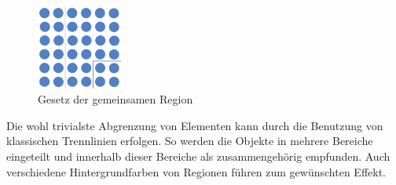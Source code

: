 \begin{figure}[H]
 \centering
 \includegraphics[width=0.25\textwidth]{grafiken/region.png}
 \caption{Gesetz der gemeinsamen Region}
 \label{fig:gesetzRegion}
\end{figure}
Die wohl trivialste Abgrenzung von Elementen kann durch die Benutzung von klassischen Trennlinien erfolgen. So werden die Objekte in mehrere Bereiche eingeteilt und innerhalb dieser Bereiche als zusammengehörig empfunden. Auch verschiedene Hintergrundfarben von Regionen führen zum gewünschten Effekt.

